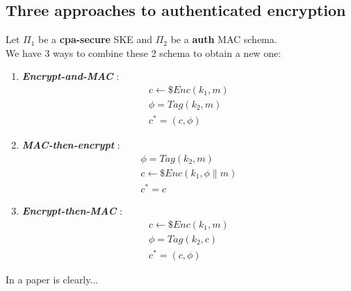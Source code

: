\subsection{Three approaches to authenticated encryption}
Let $\Pi_{1}$ be a \textbf{cpa-secure} SKE and $\Pi_{2}$ be a \textbf{auth} MAC
schema.\\
We have 3 ways to combine these 2 schema to obtain a new one:
\begin{enumerate}
    \item \textbf{ \textit{Encrypt-and-MAC} } :
        \begin{gather*}
            c \leftarrow\$ Enc(k_{1}, m)\\
            \phi = Tag(k_{2}, m)\\
            c^{*}=(c, \phi)
        \end{gather*}
        
    \item  \textbf{ \textit{MAC-then-encrypt} } :
        \begin{gather*}
            \phi = Tag(k_{2}, m)\\
            c \leftarrow\$ Enc(k_{1}, \phi \| m)\\
            c^{*}=c
        \end{gather*}
        
    \item  \textbf{ \textit{Encrypt-then-MAC} } :
        \begin{gather*}
            c \leftarrow\$ Enc(k_{1}, m)\\
            \phi = Tag(k_{2}, c) \\
            c^{*}=(c, \phi)
        \end{gather*}
        
\end{enumerate}
In a paper is clearly...



